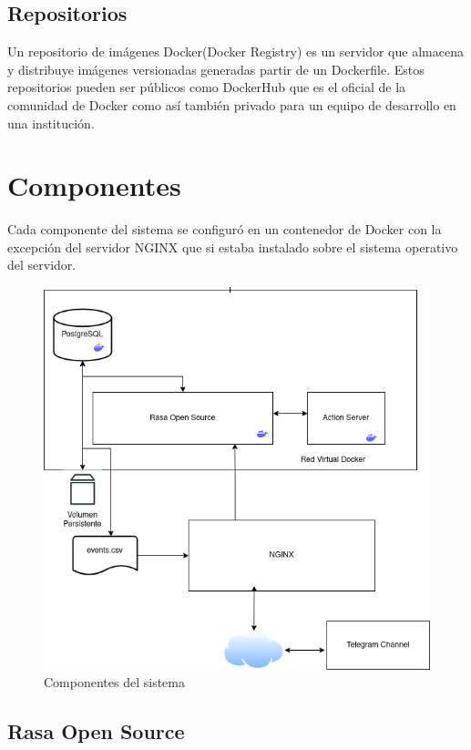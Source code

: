 \subsection{Repositorios}
Un repositorio de imágenes Docker(Docker Registry) es un servidor que almacena y distribuye imágenes versionadas generadas partir de un Dockerfile. Estos repositorios pueden ser públicos como DockerHub que es el oficial de la comunidad de Docker como así también privado para un equipo de desarrollo en una institución.
\cite{Docker}

\section{Componentes}

Cada componente del sistema se configuró en un contenedor de Docker con la excepción del servidor NGINX que si estaba instalado sobre el sistema operativo del servidor. 
\begin{figure}[ht]
    \centering
    \includegraphics[width=\textwidth]{imagenes/cap4/server.png}
    \caption{Componentes del sistema}
    \label{fig:server_diagram}
\end{figure}


\subsection{Rasa Open Source}

